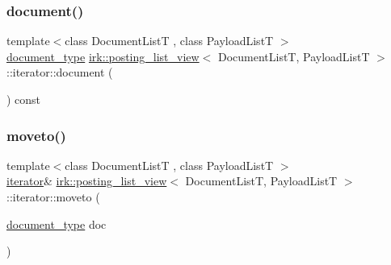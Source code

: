 \subsubsection{\texorpdfstring{document()}{document()}}
{\footnotesize\ttfamily template$<$class Document\+ListT , class Payload\+ListT $>$ \\
\mbox{\hyperlink{classirk_1_1posting__list__view_ac4615e6e3d8ee1eb9a847b7a34919977}{document\+\_\+type}} \mbox{\hyperlink{classirk_1_1posting__list__view}{irk\+::posting\+\_\+list\+\_\+view}}$<$ Document\+ListT, Payload\+ListT $>$\+::iterator\+::document (\begin{DoxyParamCaption}{ }\end{DoxyParamCaption}) const\hspace{0.3cm}{\ttfamily [inline]}}

\mbox{\label{classirk_1_1posting__list__view_1_1iterator_a2f70673e696d84d36854a359b749cd49}} 
\subsubsection{\texorpdfstring{moveto()}{moveto()}}
{\footnotesize\ttfamily template$<$class Document\+ListT , class Payload\+ListT $>$ \\
\mbox{\hyperlink{classirk_1_1posting__list__view_1_1iterator}{iterator}}\& \mbox{\hyperlink{classirk_1_1posting__list__view}{irk\+::posting\+\_\+list\+\_\+view}}$<$ Document\+ListT, Payload\+ListT $>$\+::iterator\+::moveto (\begin{DoxyParamCaption}\item[{\mbox{\hyperlink{classirk_1_1posting__list__view_ac4615e6e3d8ee1eb9a847b7a34919977}{document\+\_\+type}}}]{doc }\end{DoxyParamCaption})\hspace{0.3cm}{\ttfamily [inline]}}

\mbox{\label{classirk_1_1posting__list__view_1_1iterator_ac86c0cfbfa10ffc60fcde9a1af51bbc3}} 
